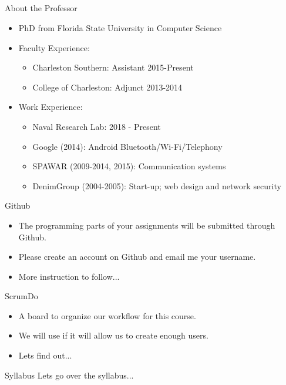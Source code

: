\documentclass{beamer}
\begin{document}
\subsection{}
\begin{frame}{About the Professor}
\begin{itemize}
\item PhD from Florida State University in Computer Science
\item Faculty Experience:
\begin{itemize}
\item Charleston Southern: Assistant 2015-Present
\item College of Charleston: Adjunct 2013-2014
\end{itemize}
\item Work Experience:
\begin{itemize}
\item Naval Research Lab: 2018 - Present
\item Google (2014): Android Bluetooth/Wi-Fi/Telephony
\item SPAWAR (2009-2014, 2015): Communication systems
\item DenimGroup (2004-2005): Start-up; web design and network security
\end{itemize}
\end{itemize}
\end{frame}

\begin{frame}{Github}
\begin{itemize}
\item The programming parts of your assignments will be submitted through Github.
\item Please create an account on Github and email me your username.
\item More instruction to follow...
\end{itemize}
\end{frame}

\begin{frame}{ScrumDo}
\begin{itemize}
\item A board to organize our workflow for this course.
\item We will use if it will allow us to create enough users.
\item Lets find out...
\end{itemize}
\end{frame}

\begin{frame}{Syllabus}
Lets go over the syllabus...
\end{frame}
\end{document}
